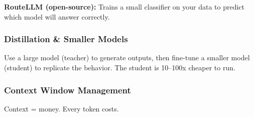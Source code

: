 \documentclass[11pt]{article}
\newenvironment{Shaded}{\begin{snugshade}}{\end{snugshade}}
\newcommand{\BuiltInTok}[1]{\textcolor[rgb]{0.50,0.55,0.55}{#1}}
\newcommand{\CommentTok}[1]{\textcolor[rgb]{0.48,0.49,0.49}{#1}}
\newcommand{\ControlFlowTok}[1]{\textcolor[rgb]{0.99,0.74,0.29}{\textbf{#1}}}
\newcommand{\KeywordTok}[1]{\textcolor[rgb]{0.81,0.81,0.76}{\textbf{#1}}}
\newcommand{\NormalTok}[1]{\textcolor[rgb]{0.81,0.81,0.76}{#1}}
\newcommand{\OperatorTok}[1]{\textcolor[rgb]{0.81,0.81,0.76}{#1}}
\newcommand{\StringTok}[1]{\textcolor[rgb]{0.96,0.31,0.31}{#1}}
\begin{document}
\begin{Shaded}
\end{Shaded}

\textbf{RouteLLM (open-source):} Trains a small classifier on your data to predict which model will answer correctly.

\subsubsection{Distillation \& Smaller Models}\label{distillation--smaller-models}

Use a large model (teacher) to generate outputs, then fine-tune a smaller model (student) to replicate the behavior. The student is 10--100x cheaper to run.

\subsubsection{Context Window Management}\label{context-window-management}

Context = money. Every token costs.
\end{document}
